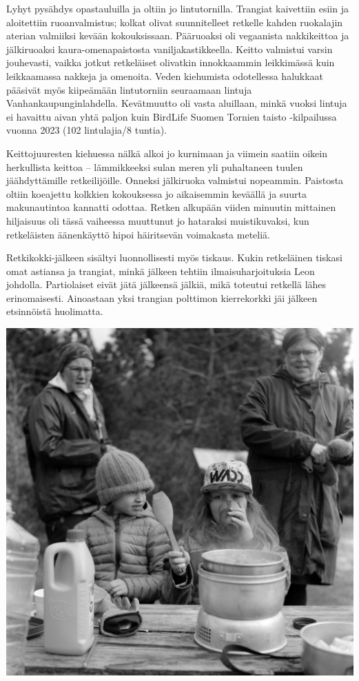 \begin{multicols}{2}
	Lyhyt pysähdys opastauluilla ja oltiin jo lintutornilla. Trangiat
	kaivettiin esiin ja aloitettiin ruoanvalmistus; kolkat olivat
	suunnitelleet retkelle kahden ruokalajin aterian valmiiksi kevään
	kokouksissaan. Pääruoaksi oli vegaanista nakkikeittoa ja jälkiruoaksi
	kaura-omenapaistosta vaniljakastikkeella. Keitto valmistui varsin
	jouhevasti, vaikka jotkut retkeläiset olivatkin innokkaammin
	leikkimässä kuin leikkaamassa nakkeja ja omenoita. Veden kiehumista
	odotellessa halukkaat pääsivät myös kiipeämään lintutorniin seuraamaan
	lintuja Vanhankaupunginlahdella. Kevätmuutto oli vasta aluillaan, minkä
	vuoksi lintuja ei havaittu aivan yhtä paljon kuin BirdLife Suomen
	Tornien taisto -kilpailussa vuonna 2023 (102 lintulajia/8 tuntia).

	\columnbreak

	Keittojuuresten kiehuessa nälkä alkoi jo kurnimaan ja viimein saatiin
	oikein herkullista keittoa – lämmikkeeksi sulan meren yli puhaltaneen
	tuulen jäähdyttämille retkeilijöille. Onneksi jälkiruoka valmistui
	nopeammin. Paistosta oltiin koeajettu kolkkien kokouksessa jo
	aikaisemmin keväällä ja suurta makunautintoa kannatti odottaa. Retken
	alkupään viiden minuutin mittainen hiljaisuus oli tässä vaiheessa
	muuttunut jo hataraksi muistikuvaksi, kun retkeläisten äänenkäyttö
	hipoi häiritsevän voimakasta meteliä. 

	Retkikokki-jälkeen sisältyi luonnollisesti myös tiskaus. Kukin
	retkeläinen tiskasi omat astiansa ja trangiat, minkä jälkeen tehtiin
	ilmaisuharjoituksia Leon johdolla. Partiolaiset eivät jätä jälkeensä
	jälkiä, mikä toteutui retkellä lähes erinomaisesti. Ainoastaan yksi
	trangian polttimon kierrekorkki jäi jälkeen etsinnöistä huolimatta.

	\vspace*{0.16cm}
	\noindent\includegraphics[width=\linewidth]{assets/kolkkienpäiväretkibw14}


\end{multicols}
